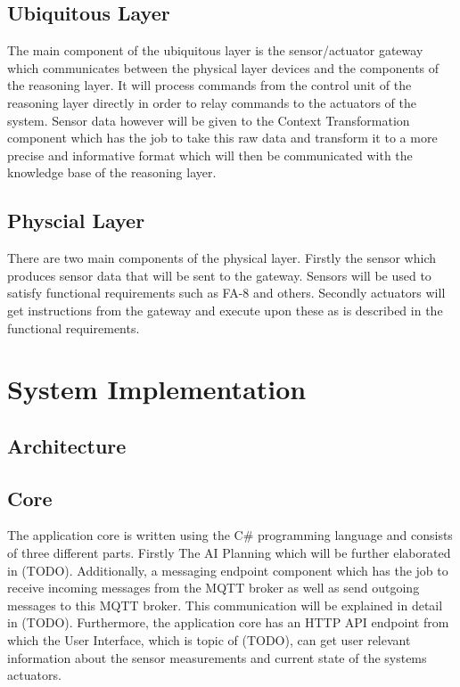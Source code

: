 \documentclass[runningheads]{llncs}
\begin{document}
    \subsection{Ubiquitous Layer}
    The main component of the ubiquitous layer is the sensor/actuator gateway which communicates between the physical layer devices and the components of the reasoning layer. It will process commands from the control unit of the reasoning layer directly in order to relay commands to the actuators of the system. Sensor data however will be given to the Context Transformation component which has the job to take this raw data and transform it to a more precise and informative format which will then be communicated with the knowledge base of the reasoning layer.

    \subsection{Physcial Layer}
    There are two main components of the physical layer. Firstly the sensor which produces sensor data that will be sent to the gateway. Sensors will be used to satisfy functional requirements such as FA-8 and others. Secondly actuators will get instructions from the gateway and execute upon these as is described in the functional requirements.

    \section{System Implementation}

    \subsection{Architecture}

    \subsection{Core}
    The application core is written using the C\# programming language and consists of three different parts. Firstly The AI Planning which will be further elaborated in (TODO). Additionally, a messaging endpoint component which has the job to receive incoming messages from the MQTT broker as well as send outgoing messages to this MQTT broker. This communication will be explained in detail in (TODO). Furthermore, the application core has an HTTP API endpoint from which the User Interface, which is topic of (TODO), can get user relevant information about the sensor measurements and current state of the systems actuators. 
\end{document}
